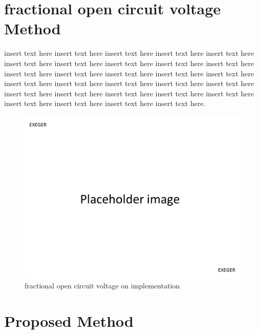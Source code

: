  \section{fractional open circuit voltage Method }
 insert text here insert text here insert text here insert text here insert text here
 insert text here insert text here insert text here insert text here insert text here insert text here insert text here insert text here insert text here insert text here insert text here insert text here insert text here insert text here insert text here insert text here insert text here insert text here insert text here insert text here insert text here insert text here insert text here insert text here.   \\
 \begin{figure}[H]
  \begin{center}
  \includegraphics[width=\textwidth]{images/pacehold}
  \caption{ fractional open circuit voltage on implementation}
  \label{fig:Frac_oc_result}
  \end{center}
  \end{figure}
\section{Proposed Method }



  



